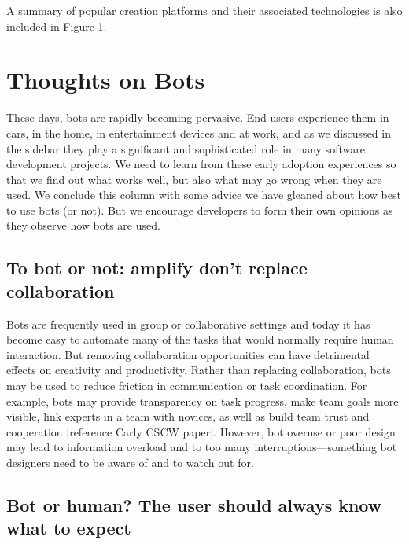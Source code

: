 \documentclass{sig-alternate}
\begin{document}
	A summary of popular creation platforms and their associated technologies is also included in Figure 1.

 \section{Thoughts on Bots}
	

	These days, bots are rapidly becoming pervasive.  End users experience them in cars, in the home, in entertainment devices and at work, and as we discussed in the sidebar they play a significant and sophisticated role in many software development projects.  
	We need to learn from these early adoption experiences so that we find out what works well, but also what may go wrong when they are used.  We conclude this column with some advice we have gleaned about how best to use bots (or not).   
	But we encourage developers to form their own opinions as they observe how bots are used. 
	
	
	\subsection{To bot or not: amplify don't replace collaboration}
		Bots are frequently used in group or collaborative settings and 
		today it has become easy to automate many of the tasks that would normally require human interaction. But removing collaboration opportunities can have detrimental effects on creativity and productivity. 
		Rather than replacing collaboration, bots may be used to reduce friction in communication or task coordination. For example, bots may provide transparency  on task progress, make team goals more visible, link experts in a team with novices, as well as build team trust and cooperation [reference Carly CSCW paper].
		However, bot overuse or poor design may lead to information overload and to too many interruptions---something bot designers need to be aware of and to watch out for.  

	\subsection{Bot or human? The user should always know what to expect}
\end{document}
